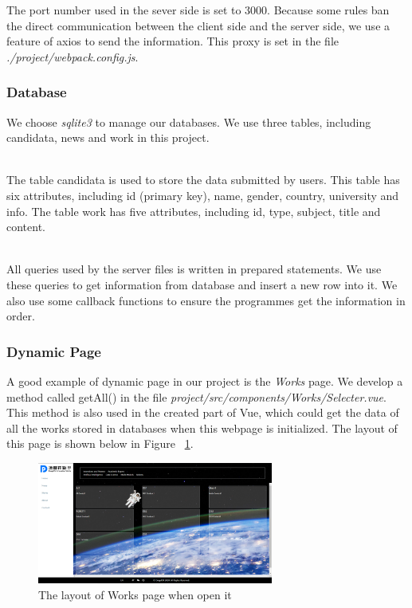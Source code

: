 \documentclass{article}
\begin{document}
The port number used in the sever side is set to 3000. Because some rules ban the 
direct communication between the client side and the server side, we use a feature
of axios to send the information. This proxy is set in the file
\textit{./project/webpack.config.js}.
\subsubsection{Database}
We choose \textit{sqlite3} to manage our databases. 
We use three tables, including candidata, news and work in this project.

~\\
\noindent
The table candidata is used to store the data submitted by users. This table
has six attributes, including id (primary key), name, gender, country, university
and info. The table work has five attributes, including id, type, subject, title 
and content.

~\\
\noindent
All queries used by the server files is written in prepared statements. We use
these queries to get information from database and insert a new row into it. We
also use some callback functions to ensure the programmes get the information 
in order.



\subsubsection{Dynamic Page}
A good example of dynamic page in our project is the \textit{Works} page.
We develop a method called getAll() in the file
\textit{project/src/components/Works/Selecter.vue}. This method is also used in the 
created part of Vue, which could get the data of all the works stored in databases
when this webpage is initialized. The layout of this page is shown below in 
Figure ~\ref{fig: figure5}.

\begin{figure}[h]
    \centering
    \includegraphics[height=4cm]{img/sectionPNG/Works1.png}
    \caption{The layout of Works page when open it}
    \label{fig: figure5}
\end{figure}
\end{document}
